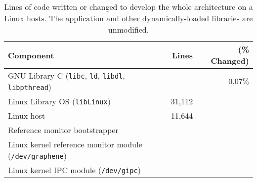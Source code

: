 \begin{table}[t!b!]
\footnotesize
\centering
\begin{tabular}{|l|rr|}
\hline
{\bf Component} & {\bf Lines} & ({\bf \% Changed})\\
\hline
GNU Library C ({\tt libc}, {\tt ld}, {\tt libdl}, {\tt libpthread}) & \libclines{} & $0.07\%$ \\
\hline
Linux Library OS ({\tt libLinux}) & 31,112 & \\
Linux host \pal{} & 11,644 & \\
\hline
Reference monitor bootstrapper & {} & \\
Linux kernel reference monitor module ({\tt /dev/graphene}) & \sandboxmodlines{} & \\
Linux kernel IPC module ({\tt /dev/gipc}) & \gipclines{} & \\
\hline
\end{tabular}
\caption[Lines of code written or changed in \graphene{}]
{Lines of code written or changed to develop the whole \graphene{} architecture on a Linux hosts.  The application and other dynamically-loaded libraries are unmodified.}
\label{tab:libos:loc}
\end{table}









